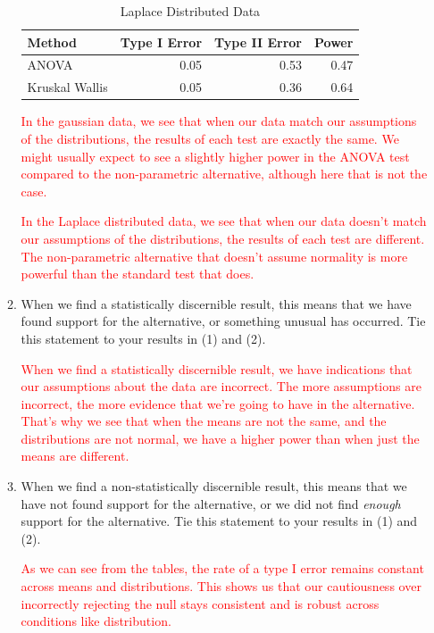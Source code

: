 \documentclass{article}\usepackage[]{graphicx}\usepackage[]{xcolor}
\begin{document}
\begin{enumerate}
\begin{enumerate}
\begin{table}[H]
\centering
\begingroup\small
\begin{tabular}{lrrr}
  \hline
Method & Type I Error & Type II Error & Power \\ 
  \hline
ANOVA & 0.05 & 0.53 & 0.47 \\ 
  Kruskal Wallis & 0.05 & 0.36 & 0.64 \\ 
   \hline
\end{tabular}
\endgroup
\caption{Laplace Distributed Data} 
\label{laplace.tab}
\end{table}


\textcolor{red}{In the gaussian data, we see that when our data match our assumptions of the distributions, the results of each test are exactly the same. We might usually expect to see a slightly higher power in the ANOVA test compared to the non-parametric alternative, although here that is not the case.}

\textcolor{red}{In the Laplace distributed data, we see that when our data doesn't match our assumptions of the distributions, the results of each test are different. The non-parametric alternative that doesn't assume normality is more powerful than the standard test that does.}

\item When we find a statistically discernible result, this means that we 
have found support for the alternative, or something unusual has occurred. 
Tie this statement to your results in (1) and (2).

\textcolor{red}{When we find a statistically discernible result, we have indications that our assumptions about the data are incorrect. The more assumptions are incorrect, the more evidence that we're going to have in the alternative. That's why we see that when the means are not the same, and the distributions are not normal, we have a higher power than when just the means are different.}

\item When we find a non-statistically discernible result, this means that
we have not found support for the alternative, or we did not find 
\emph{enough} support for the alternative. Tie this statement to your 
results in (1) and (2).

\textcolor{red}{As we can see from the tables, the rate of a type I error remains constant across means and distributions. This shows us that our cautiousness over incorrectly rejecting the null stays consistent and is robust across conditions like distribution.}


\end{enumerate}
\end{enumerate}
\end{document}
